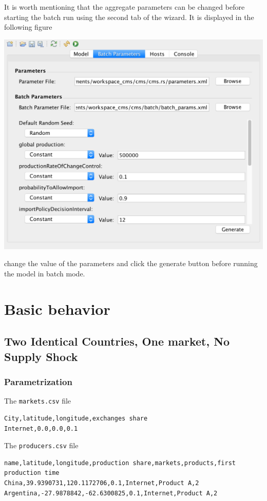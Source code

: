 \documentclass{article}
\begin{document}
It is worth mentioning that the aggregate parameters can be changed before starting the batch run using the second tab of the wizard. It is displayed in the following figure

\vskip2mm
\noindent
\includegraphics[scale=0.35]{fig_cms_rs_batch4}

\vskip2mm
\noindent
change the value of the parameters and click the generate button before running the model in batch mode.


\section{Basic behavior}
\subsection{Two Identical Countries, One market, No Supply Shock}
\subsubsection{Parametrization}

The \verb+markets.csv+ file
\begin{verbatim}
City,latitude,longitude,exchanges share
Internet,0.0,0.0,0.1
\end{verbatim}

The \verb+producers.csv+ file
\begin{verbatim}
name,latitude,longitude,production share,markets,products,first production time
China,39.9390731,120.1172706,0.1,Internet,Product A,2
Argentina,-27.9878842,-62.6300825,0.1,Internet,Product A,2
\end{verbatim}
\end{document}
